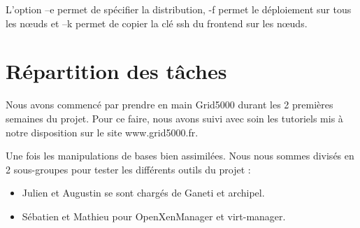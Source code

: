 L’option –e permet de spécifier la distribution, -f permet le déploiement sur tous les nœuds et –k permet de copier la clé ssh du frontend sur les nœuds.


\section{Répartition des tâches}
Nous avons commencé par prendre en main Grid5000 durant les 2 premières semaines du projet. Pour ce faire, nous avons suivi avec soin les tutoriels mis à notre disposition sur le site www.grid5000.fr.

Une fois les manipulations de bases bien assimilées. Nous nous sommes divisés en 2 sous-groupes pour tester les différents outils du projet :
\begin{itemize}
  \item Julien et Augustin se sont chargés de Ganeti et archipel.
  \item Sébatien et Mathieu pour OpenXenManager et virt-manager.
\end{itemize}


